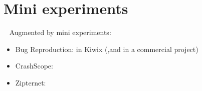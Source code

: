 \section{Mini experiments}~\label{section-mini-experiments}
Augmented by mini experiments:

\begin{itemize}
    \item Bug Reproduction: in Kiwix (,and in a commercial project)
    \item CrashScope:
    \item Zipternet: 
\end{itemize}
